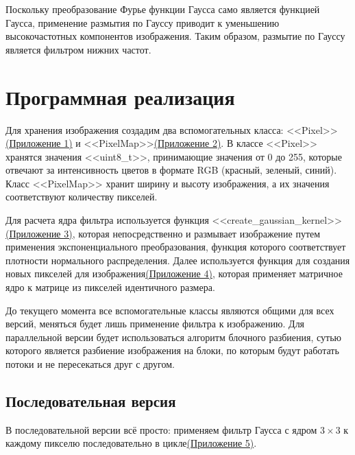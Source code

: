 \documentclass[12pt]{article}
\begin{document}
Поскольку преобразование Фурье функции Гаусса само является функцией Гаусса, применение размытия по Гауссу приводит к уменьшению высокочастотных компонентов изображения. Таким образом, размытие по Гауссу является фильтром нижних частот.


\newpage
\section{Программная реализация}
Для хранения изображения создадим два вспомогательных класса: <<Pixel>>\hyperref[lst:pixel]{(Приложение 1)} и <<PixelMap>>\hyperref[lst:pixel_map]{(Приложение 2)}. В классе <<Pixel>> хранятся значения <<uint8\_t>>, принимающие значения от 0 до 255, которые отвечают за интенсивность цветов в формате RGB (красный, зеленый, синий). Класс <<PixelMap>> хранит ширину и высоту изображения, а их значения соответствуют количеству пикселей.
\par
Для расчета ядра фильтра используется функция <<create\_gaussian\_kernel>>\hyperref[lst:kernel]{(Приложение 3)}, которая непосредственно и размывает изображение путем применения экспоненциального преобразования, функция которого соответствует плотности нормального распределения. Далее используется функция для создания новых пикселей для изображения\hyperref[lst:apply]{(Приложение 4)}, которая применяет матричное ядро к матрице из пикселей идентичного размера.
\par
До текущего момента все вспомогательные классы являются общими для всех версий, меняться будет лишь применение фильтра к изображению. Для параллельной версии будет использоваться алгоритм блочного разбиения, сутью которого является разбиение изображения на блоки, по которым будут работать потоки и не пересекаться друг с другом.


\subsection{Последовательная версия}
\par
В последовательной версии всё просто: применяем фильтр Гаусса с ядром $3 \times 3$ к каждому пикселю последовательно в цикле\hyperref[lst:seq]{(Приложение 5)}.
\end{document}
